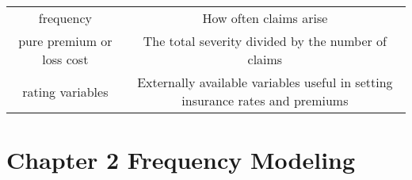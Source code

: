 \documentclass[]{book}
\theoremstyle{definition}
\theoremstyle{definition}
\theoremstyle{definition}
\theoremstyle{remark}
\begin{document}
\begin{longtable}[]{@{}cc@{}}
\begin{minipage}[t]{0.41\columnwidth}\centering\strut
frequency\strut
\end{minipage} & \begin{minipage}[t]{0.42\columnwidth}\centering\strut
How often claims arise\strut
\end{minipage}\tabularnewline
\begin{minipage}[t]{0.41\columnwidth}\centering\strut
pure premium or loss cost\strut
\end{minipage} & \begin{minipage}[t]{0.42\columnwidth}\centering\strut
The total severity divided by the number of claims\strut
\end{minipage}\tabularnewline
\begin{minipage}[t]{0.41\columnwidth}\centering\strut
rating variables\strut
\end{minipage} & \begin{minipage}[t]{0.42\columnwidth}\centering\strut
Externally available variables useful in setting insurance rates and
premiums\strut
\end{minipage}\tabularnewline
\bottomrule
\end{longtable}

\section{Chapter 2 Frequency
Modeling}\label{chapter-2-frequency-modeling}
\end{document}
